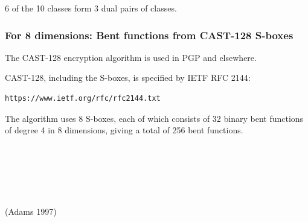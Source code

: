 \documentclass[pdf,sprung,slideColor,nocolorBG]{beamer}
\newenvironment{colortheme}[1]{
\def\ProvidesPackageRCS $##1${\relax}
\renewcommand{\ProcessOptions}{\relax}
\makeatletter

\makeatother
}{}
\newcommand{\slidecite}[1]{\tiny{(#1)}\normalsize{}}
\begin{document}
\begin{colortheme}{jubata}
\begin{frame}
\begin{figure}
\begin{minipage}{.48\textwidth}
  \label{fig:c8_10_dual_cayley_graph_index_matrix}
\end{minipage}%
\end{figure}
6 of the 10 classes form 3 dual pairs of classes.
\end{frame}

\end{colortheme}

\begin{colortheme}{seagull}

\begin{frame}[fragile]
\frametitle{For 8 dimensions: Bent functions from CAST-128 S-boxes}

The CAST-128 encryption algorithm is used in PGP and elsewhere.

CAST-128, including the S-boxes, is specified by IETF RFC 2144:
\begin{verbatim}
https://www.ietf.org/rfc/rfc2144.txt
\end{verbatim}

The algorithm uses 8 S-boxes,
each of which consists of 32 binary bent functions of degree 4 in 8 dimensions,
giving a total of 256 bent functions.

~

~

~

\slidecite{Adams 1997}
\end{frame}

\end{colortheme}
\end{document}
